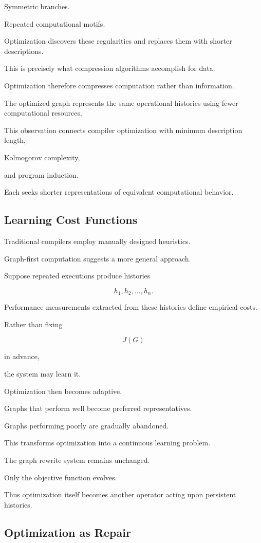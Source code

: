 \documentclass[12pt,oneside]{article}
\begin{document}
Symmetric branches.

Repeated computational motifs.

Optimization discovers these regularities and replaces them with shorter descriptions.

This is precisely what compression algorithms accomplish for data.

Optimization therefore compresses computation rather than information.

The optimized graph represents the same operational histories using fewer computational resources.

This observation connects compiler optimization with minimum description length,

Kolmogorov complexity,

and program induction.

Each seeks shorter representations of equivalent computational behavior.

\subsection{Learning Cost Functions}

Traditional compilers employ manually designed heuristics.

Graph-first computation suggests a more general approach.

Suppose repeated executions produce histories

\[
h_1,
h_2,
\ldots,
h_n.
\]

Performance measurements extracted from these histories define empirical costs.

Rather than fixing

\[
J(G)
\]

in advance,

the system may learn it.

Optimization then becomes adaptive.

Graphs that perform well become preferred representatives.

Graphs performing poorly are gradually abandoned.

This transforms optimization into a continuous learning problem.

The graph rewrite system remains unchanged.

Only the objective function evolves.

Thus optimization itself becomes another operator acting upon persistent histories.

\subsection{Optimization as Repair}
\end{document}
